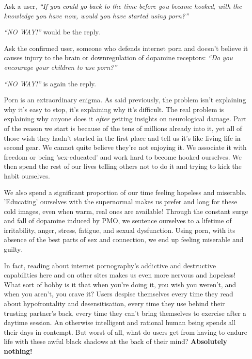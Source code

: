 \documentclass[
]{book}
\begin{document}
Ask a user, \emph{``If you could go back to the time before you became hooked, with the knowledge you have now, would you have started using porn?''}

\emph{``NO WAY!''} would be the reply.

Ask the confirmed user, someone who defends internet porn and doesn't believe it causes injury to the brain or downregulation of dopamine receptors: \emph{``Do you encourage your children to use porn?''}

\emph{``NO WAY!''} is again the reply.

Porn is an extraordinary enigma. As said previously, the problem isn't explaining why it's easy to stop, it's explaining why it's difficult. The real problem is explaining why anyone does it \emph{after} getting insights on neurological damage. Part of the reason we start is because of the tens of millions already into it, yet all of those wish they hadn't started in the first place and tell us it's like living life in second gear. We cannot quite believe they're not enjoying it. We associate it with freedom or being 'sex-educated' and work hard to become hooked ourselves. We then spend the rest of our lives telling others not to do it and trying to kick the habit ourselves.

We also spend a significant proportion of our time feeling hopeless and miserable. 'Educating' ourselves with the supernormal makes us prefer and long for these cold images, even when warm, real ones are available! Through the constant surge and fall of dopamine induced by PMO, we sentence ourselves to a lifetime of irritability, anger, stress, fatigue, and sexual dysfunction. Using porn, with its absence of the best parts of sex and connection, we end up feeling miserable and guilty.

In fact, reading about internet pornography's addictive and destructive capabilities here and on other sites makes us even more nervous and hopeless! What sort of hobby is it that when you're doing it, you wish you weren't, and when you aren't, you crave it? Users despise themselves every time they read about hypofrontality and desensitisation, every time they use behind their trusting partner's back, every time they can't bring themselves to exercise after a daytime session. An otherwise intelligent and rational human being spends all their days in contempt. But worst of all, what do users get from having to endure life with these awful black shadows at the back of their mind? \textbf{Absolutely nothing!}
\end{document}
